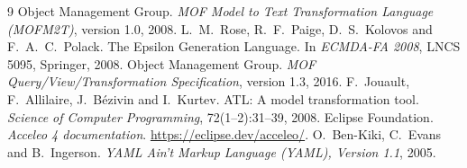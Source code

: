\documentclass[10pt, a4paper, oneside]{article}
\begin{document}
\hypersetup{pageanchor=false}

\hypersetup{pageanchor=true}
\setcounter{tocdepth}{2}
\tableofcontents

\newpage
{}









{\footnotesize
\begin{thebibliography}{9}
\setlength{\itemsep}{0pt}\setlength{\parsep}{0pt}
 Object Management Group. \emph{MOF Model to Text Transformation Language (MOFM2T)}, version 1.0, 2008.
 L.~M.~Rose, R.~F.~Paige, D.~S.~Kolovos and F.~A.~C.~Polack. The Epsilon Generation Language. In \emph{ECMDA-FA 2008}, LNCS 5095, Springer, 2008.
 Object Management Group. \emph{MOF Query/View/Transformation Specification}, version 1.3, 2016.
 F.~Jouault, F.~Allilaire, J.~B\'ezivin and I.~Kurtev. ATL: A model transformation tool. \emph{Science of Computer Programming}, 72(1--2):31--39, 2008.
 Eclipse Foundation. \emph{Acceleo 4 documentation}. \url{https://eclipse.dev/acceleo/}.
 O.~Ben-Kiki, C.~Evans and B.~Ingerson. \emph{YAML Ain't Markup Language (YAML), Version 1.1}, 2005.
\end{thebibliography}
}

\clearpage
\appendix


\end{document}
